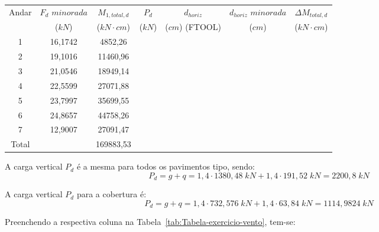 \begin{table}[H]
\centering
\begin{tabular}{c|c|c|ccc|c}
\hline
Andar & $F_d$ $minorada$ & $M_{1, total, d}$ & \multicolumn{1}{c|}{$P_d$} & \multicolumn{1}{c|}{$d_{horiz}$} & $d_{horiz}$ $minorada$ & $\Delta M_{total, d}$ \\
 & ($kN$) & ($kN\cdot cm$) & \multicolumn{1}{c|}{($kN$)} & \multicolumn{1}{c|}{($cm$) (FTOOL)} & ($cm$) & ($kN\cdot cm$) \\ \hline
1 & 16,1742 & 4852,26 & \multicolumn{1}{c|}{} & \multicolumn{1}{c|}{} &  &  \\
2 & 19,1016 & 11460,96 & \multicolumn{1}{c|}{} & \multicolumn{1}{c|}{} &  &  \\
3 & 21,0546 & 18949,14 & \multicolumn{1}{c|}{} & \multicolumn{1}{c|}{} &  &  \\
4 & 22,5599 & 27071,88 & \multicolumn{1}{c|}{} & \multicolumn{1}{c|}{} &  &  \\
5 & 23,7997 & 35699,55 & \multicolumn{1}{c|}{} & \multicolumn{1}{c|}{} &  &  \\
6 & 24,8657 & 44758,26 & \multicolumn{1}{c|}{} & \multicolumn{1}{c|}{} &  &  \\
7 & 12,9007 & 27091,47 & \multicolumn{1}{c|}{} & \multicolumn{1}{c|}{} &  &  \\ \hline
Total &  & 169883,53 &  &  &  &  \\ \cline{1-1} \cline{3-3} \cline{7-7} 
\end{tabular}
\end{table}

A carga vertical $P_d$ é a mesma para todos os pavimentos tipo, sendo: $$P_d=g+q=1,4\cdot1380,48\;kN+1,4\cdot191,52\;kN=2200,8\;kN$$

A carga vertical $P_d$ para a cobertura é: $$P_d=g+q=1,4\cdot 732,576\;kN+1,4\cdot63,84\;kN=1114,9824\;kN$$

Preenchendo a respectiva coluna na Tabela~\ref{tab:Tabela-exercicio-vento}, tem-se:

